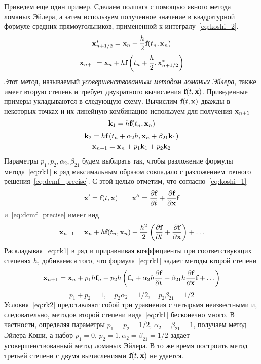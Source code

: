 Приведем еще один пример. Сделаем полшага с помощью явного метода ломаных Эйлера, а затем используем полученное
значение в квадратурной формуле средних прямоугольников, примененной к интегралу~\eqref{eq:koshi_2}.
\begin{equation}
    \bf{x}_{n+1/2}^* = \bf{x}_n + \frac{h}{2}\bf{f}(t_n, \bf{x}_n)
\end{equation}
\begin{equation*}
    \bf{x}_{n+1} = \bf{x}_n + h\bf{f}\left( t_n + \frac{h}{2}, \bf{x}_{n+1/2}^* \right)
\end{equation*}
Этот метод, называемый \emph{усовершенствованным методом ломаных Эйлера}, также имеет вторую степень и требует
двукратного вычисления $\bf{f}(t, \bf{x})$. Приведенные примеры укладываются в следующую схему. Вычислим
$\bf{f}(t, \bf{x})$ дважды в некоторых точках и их линейную комбинацию используем для получения $\bf{x}_{n+1}$
\begin{equation}
    \bf{k}_1 = h\bf{f}(t_n, \bf{x}_n) \label{eq:rk1}
\end{equation}
\begin{gather*}
    \bf{k}_2 = h\bf{f}\left( t_n + \alpha_2 h, \bf{x}_n + \beta_{21} \bf{k}_1 \right) \\
    \bf{x}_{n+1} = \bf{x}_n + p_1 \bf{k}_1 + p_2 \bf{k}_2
\end{gather*}
Параметры $p_1, p_2, \alpha_2, \beta_{21}$ будем выбирать так, чтобы разложение формулы метода~\eqref{eq:rk1} в ряд
максимальным образом совпадало с разложением точного решения~\eqref{eq:dcmf_precise}. С этой целью отметим, что
согласно~\eqref{eq:koshi_1}
\begin{equation*}
    \bf{x}' = \bf{f}(t, \bf{x}) \qquad \bf{x}'' = \frac{\partial \bf{f}}{\partial t} + \frac{\partial \bf{f}}{\partial \bf{x}}\bf{f}
\end{equation*}
и~\eqref{eq:dcmf_precise} имеет вид
\begin{equation*}
    \bf{x}_{n+1} = \bf{x}_n + h\bf{f}(t_n, \bf{x}_n) + \frac{h^2}{2}\left( \frac{\partial \bf{f}}{\partial t} + \frac{\partial \bf{f}}{\partial \bf{x}} \right) + \ldots
\end{equation*}
Раскладывая~\eqref{eq:rk1} в ряд и приравнивая коэффициенты при соответствующих степенях $h$, добиваемся того, что
формула~\eqref{eq:rk1} задает методы второй степени
\begin{equation*}
    \bf{x}_{n+1} = \bf{x}_n + p_1 h \bf{f}_n + p_2 h\left( \bf{f}_n + \alpha_2 h \frac{\partial \bf{f}}{\partial t} + \beta_{21} h \frac{\partial \bf{f}}{\partial \bf{x}}\bf{f} + \ldots \right)
\end{equation*}
\begin{equation}
    p_1 + p_2 = 1, \quad p_2 \alpha_2 = 1/2, \quad p_2 \beta_{21} = 1/2 \label{eq:rk2}
\end{equation}
Условия~\eqref{eq:rk2} представляют собой три уравнения с четырьмя неизвестными и, следовательно, методов второй
степени вида~\eqref{eq:rk1} бесконечно много. В частности, определяя параметры $p_1 = p_2 = 1/2, \, \alpha_2 = \beta_{21} = 1$,
получаем метод Эйлера-Коши, а набор $p_1 = 0, \, p_2 = 1, \alpha_2 = \beta_{21} = 1/2$ задает усовершенствованный
метод ломаных Эйлера. В то же время построить метод третьей степени с двумя вычислениями $\bf{f}(t, \bf{x})$ не удается.

